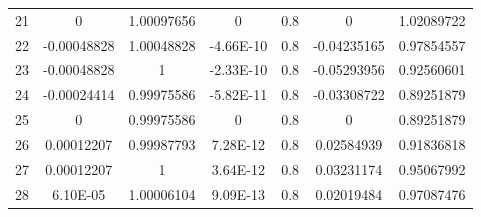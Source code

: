 \begin{table}[H]
\begin{tabular}{c|cccccc|}
    \multicolumn{1}{|l|}{21} & 0                                          & 1.00097656                           & 0                                               & 0.8                                      & 0                                                          & 1.02089722                      \\ \cline{1-1}
    \multicolumn{1}{|l|}{22} & -0.00048828                                & 1.00048828                           & -4.66E-10                                       & 0.8                                      & -0.04235165                                                & 0.97854557                      \\ \cline{1-1}
    \multicolumn{1}{|l|}{23} & -0.00048828                                & 1                                    & -2.33E-10                                       & 0.8                                      & -0.05293956                                                & 0.92560601                      \\ \cline{1-1}
    \multicolumn{1}{|l|}{24} & -0.00024414                                & 0.99975586                           & -5.82E-11                                       & 0.8                                      & -0.03308722                                                & 0.89251879                      \\ \cline{1-1}
    \multicolumn{1}{|c|}{25} & 0                                          & 0.99975586                           & 0                                               & 0.8                                      & 0                                                          & 0.89251879                      \\ \cline{1-1}
    \multicolumn{1}{|c|}{26} & 0.00012207                                 & 0.99987793                           & 7.28E-12                                        & 0.8                                      & 0.02584939                                                 & 0.91836818                      \\ \cline{1-1}
    \multicolumn{1}{|c|}{27} & 0.00012207                                 & 1                                    & 3.64E-12                                        & 0.8                                      & 0.03231174                                                 & 0.95067992                      \\ \cline{1-1}
    \multicolumn{1}{|c|}{28} & 6.10E-05                                   & 1.00006104                           & 9.09E-13                                        & 0.8                                      & 0.02019484                                                 & 0.97087476                      \\ \cline{1-1}

\end{tabular}
\end{table}
